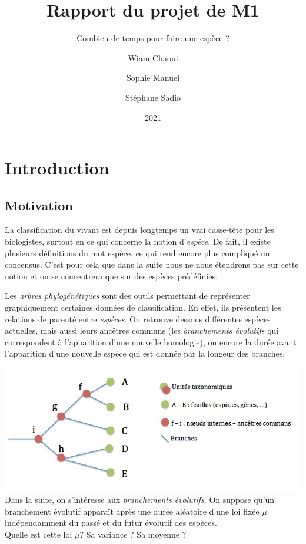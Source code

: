 \documentclass[
]{book}
\title{Rapport du projet de M1}
\subtitle{Combien de temps pour faire une espèce ?}
\author{Wiam Chaoui \and Sophie Manuel \and Stéphane Sadio}
\date{2021}
\begin{document}
\maketitle

{
\setcounter{tocdepth}{1}
\tableofcontents
}
\newtheorem{dfn}{Définition}
\newtheorem{exem}{Exemple}
\newtheorem{corol}{Corollaire}
\newtheorem{prop}{Proposition}
\newtheorem{lem}{Lemme}
\newtheorem{demo}{Démonstration}
\newtheorem{rem}{Remarque}
\newtheorem{propri}{Propriété}
\newtheorem{thm}{Théorème}

\hypertarget{intro}{%
\chapter{Introduction}\label{intro}}

\hypertarget{motivation}{%
\section{Motivation}\label{motivation}}

\hspace*{0.5cm}
La classification du vivant est depuis longtemps un vrai casse-tête pour les biologistes, surtout en ce qui concerne la notion d'\emph{espèce}. De fait, il existe plusieurs définitions du mot espèce, ce qui rend encore plus compliqué un concensus. C'est pour cela que dans la suite nous ne nous étendrons pas sur cette notion et on se concentrera que sur des espèces prédéfinies.

Les \emph{arbres phylogénétiques} sont des outils permettant de représenter graphiquement certaines données de classification. En effet, ils présentent les relations de parenté entre \emph{espèces}. On retrouve dessous différentes espèces actuelles, mais aussi leurs ancêtres communs (les \emph{branchements évolutifs} qui correspondent à l'apparition d'une nouvelle homologie), ou encore la durée avant l'apparition d'une nouvelle espèce qui est donnée par la longeur des branches.

\includegraphics{Images/arbre_intro.jpg}
Dans la suite, on s'intéresse aux \emph{branchements évolutifs}.
On suppose qu'un branchement évolutif apparaît après une durée aléatoire d'une loi fixée \(\mu\) indépendamment du passé et du futur évolutif des espèces.\\
Quelle est cette loi \(\mu\)? Sa variance ? Sa moyenne ? \newline
\end{document}
